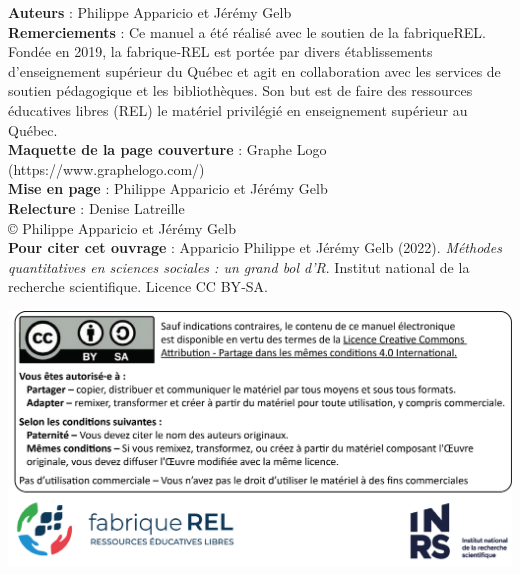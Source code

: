 

\textbf{Auteurs} : Philippe Apparicio et Jérémy Gelb\\[0.05in]
\textbf{Remerciements} : Ce manuel a été réalisé avec le soutien de la fabriqueREL. Fondée en 2019, la fabrique‑REL est portée par divers établissements d’enseignement supérieur du Québec et agit en collaboration avec les services de soutien pédagogique et les bibliothèques. Son but est de faire des ressources éducatives libres (REL) le matériel privilégié en enseignement supérieur au Québec.\\[0.05in]
\textbf{Maquette de la page couverture} : Graphe Logo (https://www.graphelogo.com/)\\[0.05in]
\textbf{Mise en page} : Philippe Apparicio et Jérémy Gelb\\[0.05in]
\textbf{Relecture} : Denise Latreille\\[0.2in]

© Philippe Apparicio et Jérémy Gelb\\[0.2in]

\textbf{Pour citer cet ouvrage} : Apparicio Philippe et Jérémy Gelb (2022). \textit{Méthodes quantitatives en sciences sociales : un grand bol d’R}. Institut national de la recherche scientifique. Licence CC BY‑SA.\\[1in]

\begin{center}
\includegraphics{images/licence_logos.png}
\end{center}

